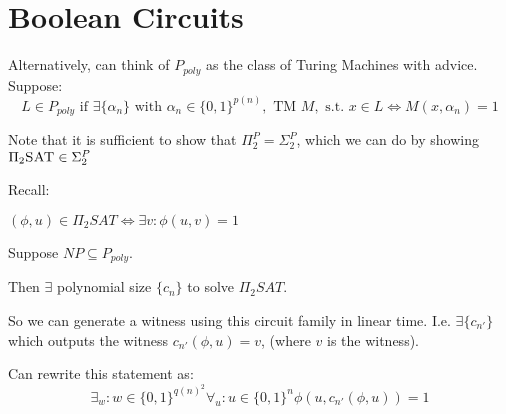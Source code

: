 \documentclass[11pt]{article} %
\begin{document}
\centerline{\LARGE\thishw}

\section{Boolean Circuits}



Alternatively, can think of $P_{poly}$ as the class of Turing Machines with advice. Suppose:
\begin{equation}
L \in P_{poly} \text{ if } \exists \{\alpha_n\} \text{ with } \alpha_n \in \{0,1\}^{p(n)}, \text{ TM } M, \text{ s.t. } x \in L \iff M(x, \alpha_n) = 1
\end{equation}


 Note that it is sufficient to show that $\Pi_2^P = \Sigma_2^P$, which we can do by showing $\Pi_2\textsc{SAT} \in \Sigma_2^P$

Recall:

$(\phi, u) \in \Pi_2 SAT \iff \exists v : \phi(u,v) = 1$

Suppose $NP \subseteq P_{poly}$.

Then $\exists$ polynomial size $\{c_n\}$ to solve $\Pi_2 SAT$.

So we can generate a witness using this circuit family in linear time. I.e. $\exists \{c_{n'}\}$ which outputs the witness $c_{n'}(\phi,u) = v$, (where $v$ is the witness).

Can rewrite this statement as:
\begin{equation}
\exists_w : w \in \{0,1\}^{q(n)^2} \forall_u : u \in \{0,1\}^n \phi(u, c_{n'}(\phi, u)) = 1
\label{eq:conc}
\end{equation}
\end{document}
